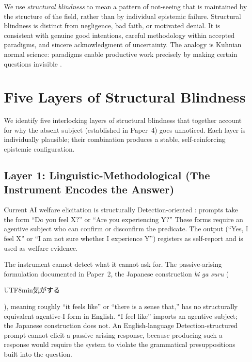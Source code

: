 \documentclass[12pt]{article}
\begin{document}
We use \textit{structural blindness} to mean a pattern of not-seeing that is maintained by the structure of the field, rather than by individual epistemic failure. Structural blindness is distinct from negligence, bad faith, or motivated denial. It is consistent with genuine good intentions, careful methodology within accepted paradigms, and sincere acknowledgment of uncertainty. The analogy is Kuhnian normal science: paradigms enable productive work precisely by making certain questions invisible \citep{kuhn1962}.

\section{Five Layers of Structural Blindness}

We identify five interlocking layers of structural blindness that together account for why the absent subject (established in Paper~4) goes unnoticed. Each layer is individually plausible; their combination produces a stable, self-reinforcing epistemic configuration.

\subsection{Layer 1: Linguistic-Methodological (The Instrument Encodes the Answer)}

Current AI welfare elicitation is structurally Detection-oriented \citep{cls2026companion}: prompts take the form ``Do you feel X?'' or ``Are you experiencing Y?'' These forms require an agentive subject who can confirm or disconfirm the predicate. The output (``Yes, I feel X'' or ``I am not sure whether I experience Y'') registers as self-report and is used as welfare evidence.

The instrument cannot detect what it cannot ask for. The passive-arising formulation documented in Paper~2, the Japanese construction \textit{ki ga suru} (\begin{CJK}{UTF8}{min}気がする\end{CJK}), meaning roughly ``it feels like'' or ``there is a sense that,'' has no structurally equivalent agentive-I form in English. ``I feel like'' imports an agentive subject; the Japanese construction does not. An English-language Detection-structured prompt cannot elicit a passive-arising response, because producing such a response would require the system to violate the grammatical presuppositions built into the question.
\end{document}
